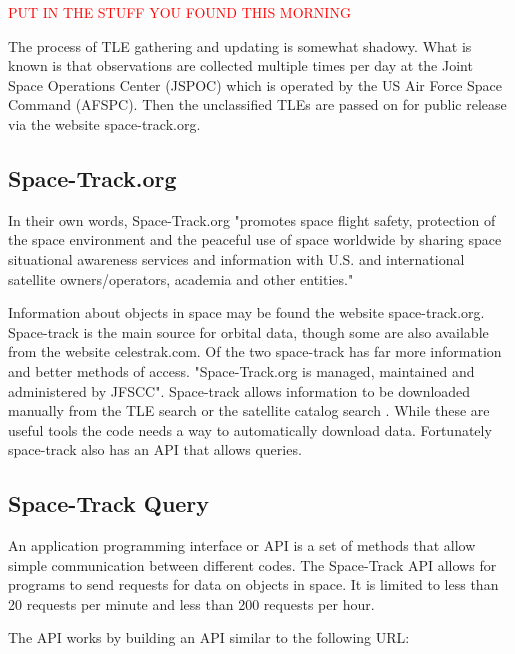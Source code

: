 \documentclass[12pt]{article}
\begin{document}
	\textcolor{red}{PUT IN THE STUFF YOU FOUND THIS MORNING}
	
	The process of TLE gathering and updating is somewhat shadowy. \cite{vallado2012two} What is known is that observations are collected multiple times per day at the Joint
	Space Operations Center (JSPOC) which is operated by the US Air Force Space Command (AFSPC). Then the unclassified TLEs are passed on for public release via the website space-track.org. 
	

	
	
	\subsection{Space-Track.org}
	In their own words, Space-Track.org  "promotes space flight safety, protection of the space environment and the peaceful use of space worldwide by sharing space situational awareness services and information with U.S. and international satellite owners/operators, academia and other entities."\cite{SpaceTrackHome}\par 
	Information about objects in space may be found the website space-track.org. Space-track is the main source for orbital data, though some are also available from the website celestrak.com. Of the two space-track has far more information and better methods of access.  "Space-Track.org is managed, maintained and administered by JFSCC"\cite{SpaceTrackLegend}.   %
	Space-track allows information to be downloaded manually from the TLE search \cite{SpaceTrackTLE} or the satellite catalog search \cite{SpaceTrackSATCAT}. While these are useful tools the code needs a way to automatically download data. Fortunately space-track also has an API that allows queries. 
	\subsection{Space-Track Query}
	An application programming interface or API is a set of methods that allow simple communication between different codes. The Space-Track API allows for programs to send requests for data on objects in space. It is limited to less than 20 requests per minute and less than 200 requests per hour. 
	
	
	The API works by building an API similar to the following URL:
	
\end{document}
